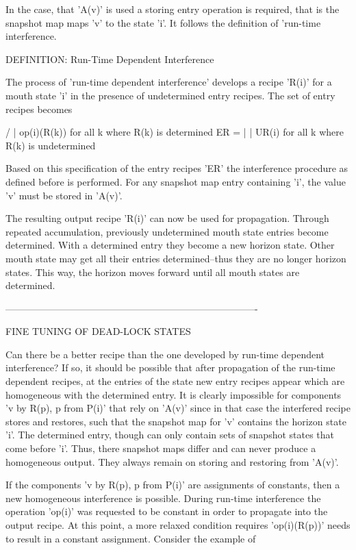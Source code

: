 \documentclass[12pt]{article}
\begin{document}
In the case, that 'A(v)' is used a storing entry operation is required, that is
the snapshot map maps 'v' to the state 'i'. It follows the definition of
'run-time interference.

DEFINITION: Run-Time Dependent Interference

    The process of 'run-time dependent interference' develops a recipe 'R(i)'
    for a mouth state 'i' in the presence of undetermined entry recipes. The
    set of entry recipes becomes

            /
            |   op(i)(R(k))  for all k where R(k) is determined
       ER = | 
            |   UR(i)        for all k where R(k) is undetermined
            \             

    Based on this specification of the entry recipes 'ER' the interference
    procedure as defined before is performed. For any snapshot map entry
    containing 'i', the value 'v' must be stored in 'A(v)'.

The resulting output recipe 'R(i)' can now be used for propagation. Through
repeated accumulation, previously undetermined mouth state entries become
determined. With a determined entry they become a new horizon state. Other
mouth state may get all their entries determined--thus they are no longer
horizon states. This way, the horizon moves forward until all mouth states are
determined. 

-------------------------------------------------------------------------------

FINE TUNING OF DEAD-LOCK STATES

Can there be a better recipe than the one developed by run-time dependent
interference? If so, it should be possible that after propagation of the
run-time dependent recipes, at the entries of the state new entry recipes
appear which are homogeneous with the determined entry. It is clearly
impossible for components 'v by R(p), p from P(i)' that rely on 'A(v)' since in
that case the interfered recipe stores and restores, such that the snapshot map
for 'v' contains the horizon state 'i'. The determined entry, though can only
contain sets of snapshot states that come before 'i'. Thus, there snapshot maps
differ and can never produce a homogeneous output. They always remain on
storing and restoring from 'A(v)'.

If the components 'v by R(p), p from P(i)' are assignments of constants, then a
new homogeneous interference is possible. During run-time interference the 
operation 'op(i)' was requested to be constant in order to propagate into the
output recipe. At this point, a more relaxed condition requires 'op(i)(R(p))'
needs to result in a constant assignment. Consider the example of 
\end{document}
